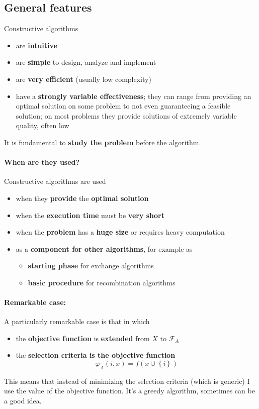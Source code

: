 \newpage

\subsection{General features}
Constructive algorithms
\begin{itemize}
	\item are \textbf{intuitive}
	\item are \textbf{simple} to design, analyze and implement
	\item are \textbf{very efficient} (usually low complexity)
	\item have a \textbf{strongly variable effectiveness}; they can range from providing an optimal solution on some problem to not even guaranteeing a feasible solution; on most problems they provide solutions of extremely variable quality, often low
\end{itemize}
It is fundamental to \textbf{study the problem} before the algorithm.\\

\paragraph{When are they used?} Constructive algorithms are used
\begin{itemize}
	\item when they \textbf{provide} the \textbf{optimal solution}
	\item when the \textbf{execution time} must be \textbf{very short} 
	\item when the \textbf{problem} has a \textbf{huge size} or requires heavy computation 
	\item as a \textbf{component for other algorithms}, for example as
	\begin{itemize}
		\item \textbf{starting phase} for exchange algorithms 
		\item \textbf{basic procedure} for recombination algorithms
	\end{itemize}
\end{itemize}

\paragraph{Remarkable case:} A particularly remarkable case is that in which
\begin{itemize}
	\item the \textbf{objective function} is \textbf{extended} from $X$ to $\mathcal{F}_A$
	\item the \textbf{selection criteria is the objective function}
	$$ \varphi_A (i,x) = f\left(x \cup \left\{i\right\}\right) $$
\end{itemize}
This means that instead of minimizing the selection criteria (which is generic) I use the value of the objective function. It's a greedy algorithm, sometimes can be a good idea.\\

